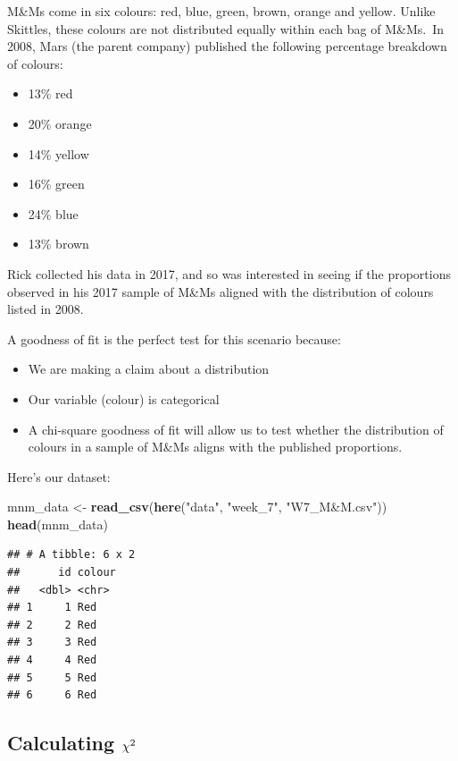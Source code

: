 \documentclass[
]{book}
\newenvironment{Shaded}{\begin{snugshade}}{\end{snugshade}}
\newcommand{\FunctionTok}[1]{\textcolor[rgb]{0.13,0.29,0.53}{\textbf{#1}}}
\newcommand{\NormalTok}[1]{#1}
\newcommand{\OtherTok}[1]{\textcolor[rgb]{0.56,0.35,0.01}{#1}}
\newcommand{\StringTok}[1]{\textcolor[rgb]{0.31,0.60,0.02}{#1}}
\providecommand{\tightlist}{%
  \setlength{\itemsep}{0pt}\setlength{\parskip}{0pt}}
\begin{document}
M\&Ms come in six colours: red, blue, green, brown, orange and yellow. Unlike Skittles, these colours are not distributed equally within each bag of M\&Ms.~In 2008, Mars (the parent company) published the following percentage breakdown of colours:

\begin{itemize}
\tightlist
\item
  13\% red
\item
  20\% orange
\item
  14\% yellow
\item
  16\% green
\item
  24\% blue
\item
  13\% brown
\end{itemize}

Rick collected his data in 2017, and so was interested in seeing if the proportions observed in his 2017 sample of M\&Ms aligned with the distribution of colours listed in 2008.

A goodness of fit is the perfect test for this scenario because:

\begin{itemize}
\tightlist
\item
  We are making a claim about a distribution
\item
  Our variable (colour) is categorical
\item
  A chi-square goodness of fit will allow us to test whether the distribution of colours in a sample of M\&Ms aligns with the published proportions.
\end{itemize}

Here's our dataset:

\begin{Shaded}
\begin{Highlighting}[]
\NormalTok{mnm\_data }\OtherTok{\textless{}{-}} \FunctionTok{read\_csv}\NormalTok{(}\FunctionTok{here}\NormalTok{(}\StringTok{"data"}\NormalTok{, }\StringTok{"week\_7"}\NormalTok{, }\StringTok{"W7\_M\&M.csv"}\NormalTok{))}
\FunctionTok{head}\NormalTok{(mnm\_data)}
\end{Highlighting}
\end{Shaded}

\begin{verbatim}
## # A tibble: 6 x 2
##      id colour
##   <dbl> <chr> 
## 1     1 Red   
## 2     2 Red   
## 3     3 Red   
## 4     4 Red   
## 5     5 Red   
## 6     6 Red
\end{verbatim}

\hypertarget{calculating-chi2}{%
\subsection{\texorpdfstring{Calculating \(\\\chi^2\)}{Calculating \textbackslash\textbackslash\textbackslash chi\^{}2}}\label{calculating-chi2}}
\end{document}
